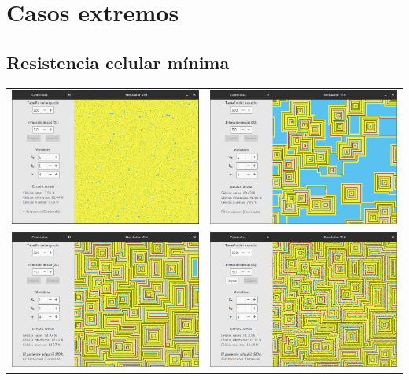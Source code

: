 \documentclass[12pt,letterpaper,oneside]{report}
\begin{document}
	\section{Casos extremos} %
	\label{sec:casos_extremos_2}
	\subsection{Resistencia celular mínima} %
	\label{sub:resistencia_celular_m_nima}
	\begin{center}
		\begin{tabular}{c c}
		\includegraphics[width=8cm]{img/resistencia/min/1.png} & \includegraphics[width=8cm]{img/resistencia/min/2.png} \\
		\includegraphics[width=8cm]{img/resistencia/min/3.png} & \includegraphics[width=8cm]{img/resistencia/min/4.png} \\
		\end{tabular}
	\end{center}
\end{document}
